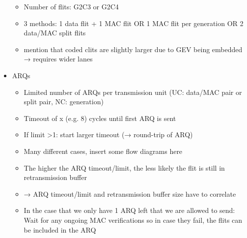 \begin{itemize}
        \begin{itemize}
            \item Number of flits: G2C3 or G2C4
            \item 3 methods: 1 data flit + 1 MAC flit OR 1 MAC flit per generation OR 2 data/MAC split flits
            \item mention that coded clits are slightly larger due to GEV being embedded → requires wider lanes
        \end{itemize}
    \item ARQs
        \begin{itemize}
            \item Limited number of ARQs per transmission unit (UC: data/MAC pair or split pair, NC: generation)
            \item Timeout of x (e.g. 8) cycles until first ARQ is sent
            \item If limit >1: start larger timeout (→ round-trip of ARQ)
            \item Many different cases, insert some flow diagrams here
            \item The higher the ARQ timeout/limit, the less likely the flit is still in retransmission buffer
            \item → ARQ timeout/limit and retransmission buffer size have to correlate
            \item In the case that we only have 1 ARQ left that we are allowed to send: Wait for any ongoing MAC verifications
                so in case they fail, the flits can be included in the ARQ
        \end{itemize}
\end{itemize}
